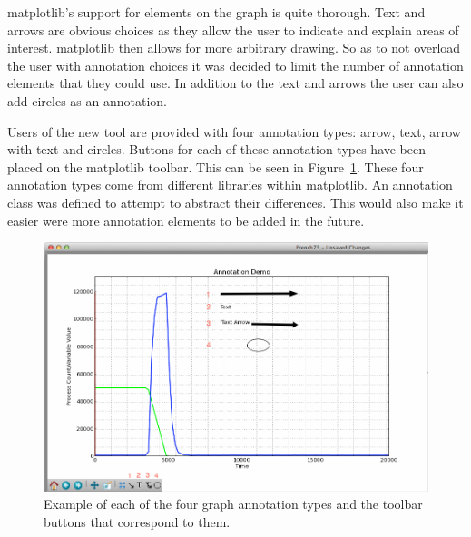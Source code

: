 
matplotlib's support for elements on the graph is quite thorough.  Text and arrows are obvious choices as they allow the user to indicate and explain areas of interest.  matplotlib then allows for more arbitrary drawing.  So as to not overload the user with annotation choices it was decided to limit the number of annotation elements that they could use.  In addition to the text and arrows the user can also add circles as an annotation.

Users of the new tool are provided with four annotation types: arrow, text, arrow with text and circles.  Buttons for each of these annotation types have been placed on the matplotlib toolbar.  This can be seen in Figure~\ref{fig:annotation_demo}.  These four annotation types come from different libraries within matplotlib.  An annotation class was defined to attempt to abstract their differences.  This would also make it easier were more annotation elements to be added in the future.

\begin{figure}[h!]
    \centering
    \includegraphics[width=\textwidth]{images/annotation_demo.png}
    \caption{Example of each of the four graph annotation types and the toolbar buttons that correspond to them.}
    \label{fig:annotation_demo}
\end{figure}

